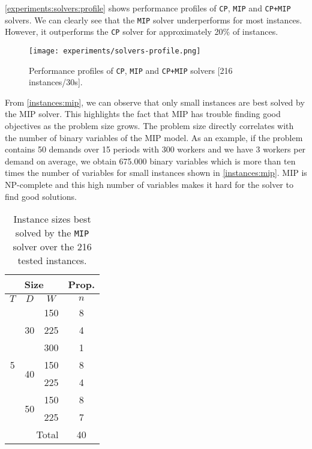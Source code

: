 \documentclass[../../thesis.tex]{subfiles}
\begin{document}
\autoref{experiments:solvers:profile} 
shows performance profiles of \texttt{CP}, \texttt{MIP} and \texttt{CP+MIP} solvers. We can clearly see that 
the \texttt{MIP} solver underperforms for most instances. However, it outperforms the \texttt{CP} solver for approximately
20\% of instances. 

\begin{figure}
  \centering
  \texttt{[image: experiments/solvers-profile.png]}
  \caption{Performance profiles of \texttt{CP}, \texttt{MIP} and \texttt{CP+MIP} solvers [216 instances/30s].}
  \label{experiments:solvers:profile}
\end{figure}

From \autoref{instances:mip}, we can observe that only small instances are best solved by the MIP solver. 
This highlights the fact that MIP has trouble finding good objectives as the problem size grows.
The problem size directly correlates with the number of binary variables of the MIP model. As an example,
if the problem contains 50 demands over 15 periods with 300 workers and we have 3 workers per demand on average,
we obtain 675.000 binary variables which is more than ten times the number of variables for small instances shown 
in \autoref{instances:mip}. MIP is NP-complete and this high number of variables makes it hard for the solver to find good solutions.


\begin{table}[H]
  \caption{Instance sizes best solved by the \texttt{MIP} solver over the 216 tested instances.}
  \label{instances:mip}
  \centering
  \begin{tabular}[t]{|c|c|c |c|}
    \hline
    \multicolumn{3}{|c|}{Size} & \multicolumn{1}{|c|}{Prop.} \\
    \hline 
    $T$ & $D$ & $W$ & $n$  \\
    \hline 
    \multirow{7}{*}{5} & \multirow{3}{*}{30} & 150 & 8  \\ 
    \cline{3-4}
     &  & 225 & 4  \\ 
     \cline{3-4}
     &  & 300 & 1  \\ 
     \cline{2-4}
     & \multirow{2}{*}{40} & 150 & 8  \\ 
     \cline{3-4}
     &  & 225 & 4  \\ 
     \cline{3-4}
     \cline{2-4}
     & \multirow{2}{*}{50} & 150 & 8  \\ 
     \cline{3-4}
     &  & 225 & 7  \\ 
     \hline
     \multicolumn{3}{|r|}{Total} & 40 \\
      \hline
  \end{tabular}
\end{table}
\end{document}
